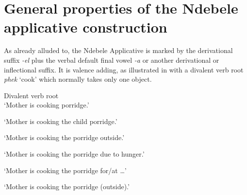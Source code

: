 \documentclass[output=paper]{langsci/langscibook}
\begin{document}
\section{General properties of the Ndebele applicative construction}\label{sec:sibanda:3}

As already alluded to, the Ndebele Applicative is marked by the derivational suffix \textit{\textit{-el}} plus the verbal default final vowel \textit{-a} or another derivational or inflectional suffix. It is valence adding, as illustrated in  with a divalent verb root \textit{phek} ‘cook’ which normally takes only one object. 

\ea\label{ex:sibanda:2}
\settowidth{}
{Divalent verb root} \\
\glt ‘Mother is cooking porridge.’

\glt ‘Mother is cooking the child porridge.’

\glt ‘Mother is cooking the porridge outside.’

\glt ‘Mother is cooking the porridge due to hunger.’

\glt ‘Mother is cooking the porridge for/at …’

\glt ‘Mother is cooking the porridge (outside).’
\z
\z
\end{document}
